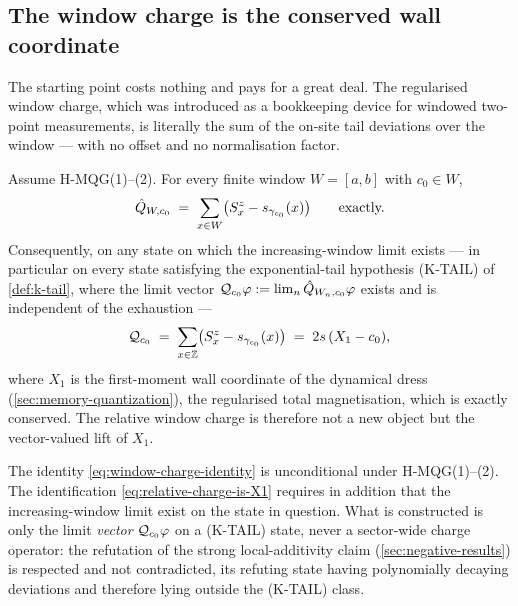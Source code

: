 \subsection{The window charge is the conserved wall coordinate}
\label{subsec:window-charge-identity}

The starting point costs nothing and pays for a great deal. The regularised
window charge, which was introduced as a bookkeeping device for windowed
two-point measurements, is literally the sum of the on-site tail deviations
over the window --- with no offset and no normalisation factor.

\begin{theorem}
\label{thm:window-charge-identity}
\statusProved\;
Assume H-MQG(1)--(2). For every finite window $W=[a,b]$ with $c_0\in W$,
\begin{equation}
  \hat{Q}_{W,c_0}\;=\;\sum_{x\in W}\bigl(S^z_x-s_{\gamma_{c_0}}(x)\bigr)
  \qquad\text{exactly.}
  \label{eq:window-charge-identity}
\end{equation}
Consequently, on any state on which the increasing-window limit exists --- in
particular on every state satisfying the exponential-tail hypothesis (K-TAIL)
of \cref{def:k-tail}, where the limit vector
$\mathcal{Q}_{c_0}\varphi:=\lim_n\hat{Q}_{W_n,c_0}\varphi$ exists and is independent
of the exhaustion ---
\begin{equation}
  \mathcal{Q}_{c_0}\;=\;\sum_{x\in\mathbb{Z}}\bigl(S^z_x-s_{\gamma_{c_0}}(x)\bigr)
  \;=\;2s\,(X_1-c_0),
  \label{eq:relative-charge-is-X1}
\end{equation}
where $X_1$ is the first-moment wall coordinate of the dynamical dress
(\cref{sec:memory-quantization}), the regularised total magnetisation, which
is exactly conserved. The relative window charge is therefore not a new
object but the vector-valued lift of $X_1$.
\end{theorem}

\begin{scope}
\label{scope:window-charge-identity}
The identity \eqref{eq:window-charge-identity} is unconditional under
H-MQG(1)--(2). The identification \eqref{eq:relative-charge-is-X1} requires in
addition that the increasing-window limit exist on the state in question. What
is constructed is only the limit \emph{vector} $\mathcal{Q}_{c_0}\varphi$ on a
(K-TAIL) state, never a sector-wide charge operator: the refutation of the
strong local-additivity claim (\cref{sec:negative-results}) is respected and
not contradicted, its refuting state having polynomially decaying deviations
and therefore lying outside the (K-TAIL) class.
\end{scope}

